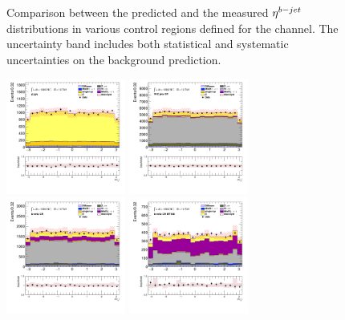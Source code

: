 \begin{figure}[!htp]
\begin{center}
			\end{center}
			\caption{
			Comparison between the predicted and the measured $\eta^{b-jet}$ distributions in various control regions defined for the \taujets channel. The uncertainty band includes both statistical and systematic uncertainties on the background prediction. 
			}
			\label{fig:bkg-bjet-eta-taujets}
		\end{figure}

		\begin{figure}[!htp]
			\begin{center}    
			\includegraphics[width=0.35\textwidth]{chapters/chapter6_HPlus/images/taujets/tau_0_phi_TTBAR.png}
			\includegraphics[width=0.35\textwidth]{chapters/chapter6_HPlus/images/taujets/tau_0_phi_WJETS.png} \\
			\includegraphics[width=0.35\textwidth]{chapters/chapter6_HPlus/images/taujets/tau_0_phi_BVETO.png}
			\includegraphics[width=0.35\textwidth]{chapters/chapter6_HPlus/images/taujets/tau_0_phi_BVETO_MT100.png} \\

\end{center}
\end{figure}
